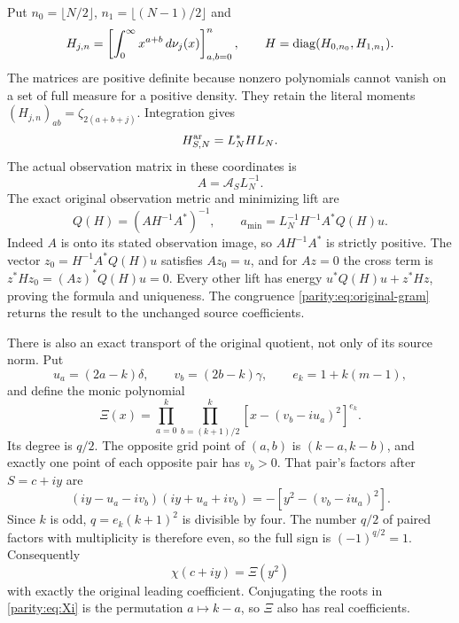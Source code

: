 Put $n_0=\lfloor N/2\rfloor$, $n_1=\lfloor(N-1)/2\rfloor$ and
\begin{equation}\label{parity:eq:parity-grams}
 H_{j,n}=\left[\int_0^\infty x^{a+b}\,d\nu_j(x)\right]_{a,b=0}^n,
 \qquad H=\operatorname{diag}(H_{0,n_0},H_{1,n_1}).
\end{equation}
The matrices are positive definite because nonzero polynomials
cannot vanish on a set of full measure for a positive density.
They retain the literal moments
$(H_{j,n})_{ab}=\zeta_{2(a+b+j)}$. Integration gives
\begin{equation}\label{parity:eq:original-gram}
 H_{S,N}^{\rm ar}=L_N^*HL_N.
\end{equation}
The actual observation matrix in these coordinates is
\begin{equation}\label{parity:eq:observation}
A=\mathcal A_SL_N^{-1}.
\end{equation}
The exact original observation metric and minimizing lift are
\begin{equation}\label{parity:eq:Q}
 Q(H)=(AH^{-1}A^*)^{-1},\qquad
 a_{\min}=L_N^{-1}H^{-1}A^*Q(H)u.
\end{equation}
Indeed $A$ is onto its stated observation image, so $AH^{-1}A^*$
is strictly positive. The vector $z_0=H^{-1}A^*Q(H)u$ satisfies
$Az_0=u$, and for $Az=0$ the cross term is
$z^*Hz_0=(Az)^*Q(H)u=0$. Every other lift has energy
$u^*Q(H)u+z^*Hz$, proving the formula and uniqueness. The
congruence \eqref{parity:eq:original-gram} returns the result to the
unchanged source coefficients.

There is also an exact transport of the original quotient, not
only of its source norm. Put
\[
 u_a=(2a-k)\delta,\qquad v_b=(2b-k)\gamma,\qquad
 e_k=1+k(m-1),
\]
and define the monic polynomial
\begin{equation}\label{parity:eq:Xi}
 \Xi(x)=\prod_{a=0}^k\prod_{b=(k+1)/2}^{k}
                 [x-(v_b-iu_a)^2]^{e_k}.
\end{equation}
Its degree is $q/2$. The opposite grid point of $(a,b)$ is
$(k-a,k-b)$, and exactly one point of each opposite pair has
$v_b>0$. That pair's factors after $S=c+iy$ are
\[
 (iy-u_a-iv_b)(iy+u_a+iv_b)
          =-[y^2-(v_b-iu_a)^2].
\]
Since $k$ is odd, $q=e_k(k+1)^2$ is divisible by four. The number
$q/2$ of paired factors with multiplicity is therefore even,
so the full sign is $(-1)^{q/2}=1$. Consequently
\begin{equation}\label{parity:eq:chi-square}
 \chi(c+iy)=\Xi(y^2)
\end{equation}
with exactly the original leading coefficient. Conjugating the
roots in \eqref{parity:eq:Xi} is the permutation $a\mapsto k-a$, so
$\Xi$ also has real coefficients.

